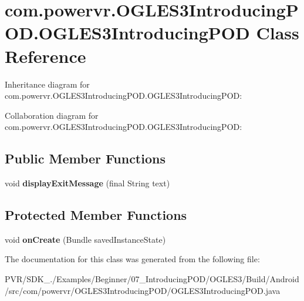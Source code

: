 \hypertarget{classcom_1_1powervr_1_1_o_g_l_e_s3_introducing_p_o_d_1_1_o_g_l_e_s3_introducing_p_o_d}{\section{com.\+powervr.\+O\+G\+L\+E\+S3\+Introducing\+P\+O\+D.\+O\+G\+L\+E\+S3\+Introducing\+P\+O\+D Class Reference}
\label{classcom_1_1powervr_1_1_o_g_l_e_s3_introducing_p_o_d_1_1_o_g_l_e_s3_introducing_p_o_d}
}


Inheritance diagram for com.\+powervr.\+O\+G\+L\+E\+S3\+Introducing\+P\+O\+D.\+O\+G\+L\+E\+S3\+Introducing\+P\+O\+D\+:


Collaboration diagram for com.\+powervr.\+O\+G\+L\+E\+S3\+Introducing\+P\+O\+D.\+O\+G\+L\+E\+S3\+Introducing\+P\+O\+D\+:
\subsection*{Public Member Functions}
\begin{DoxyCompactItemize}
\item 
\hypertarget{classcom_1_1powervr_1_1_o_g_l_e_s3_introducing_p_o_d_1_1_o_g_l_e_s3_introducing_p_o_d_a5a3eebc6b667cebd50676e0bea192d1e}{void {\bfseries display\+Exit\+Message} (final String text)}\label{classcom_1_1powervr_1_1_o_g_l_e_s3_introducing_p_o_d_1_1_o_g_l_e_s3_introducing_p_o_d_a5a3eebc6b667cebd50676e0bea192d1e}

\end{DoxyCompactItemize}
\subsection*{Protected Member Functions}
\begin{DoxyCompactItemize}
\item 
\hypertarget{classcom_1_1powervr_1_1_o_g_l_e_s3_introducing_p_o_d_1_1_o_g_l_e_s3_introducing_p_o_d_ad392e73d0ecff2637b2890bd4a05a632}{void {\bfseries on\+Create} (Bundle saved\+Instance\+State)}\label{classcom_1_1powervr_1_1_o_g_l_e_s3_introducing_p_o_d_1_1_o_g_l_e_s3_introducing_p_o_d_ad392e73d0ecff2637b2890bd4a05a632}

\end{DoxyCompactItemize}


The documentation for this class was generated from the following file\+:\begin{DoxyCompactItemize}
\item 
P\+V\+R/\+S\+D\+K\+\_./\+Examples/\+Beginner/07\+\_\+\+Introducing\+P\+O\+D/\+O\+G\+L\+E\+S3/\+Build/\+Android/src/com/powervr/\+O\+G\+L\+E\+S3\+Introducing\+P\+O\+D/O\+G\+L\+E\+S3\+Introducing\+P\+O\+D.\+java\end{DoxyCompactItemize}
